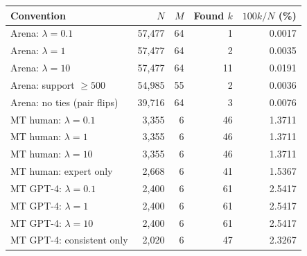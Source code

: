 \begin{tabular}{lrrrr}
\toprule
Convention & $N$ & $M$ & Found $k$ & $100k/N$ (\%) \\
\midrule
Arena: $\lambda=0.1$ & 57,477 & 64 & 1 & 0.0017 \\
Arena: $\lambda=1$ & 57,477 & 64 & 2 & 0.0035 \\
Arena: $\lambda=10$ & 57,477 & 64 & 11 & 0.0191 \\
Arena: support $\geq500$ & 54,985 & 55 & 2 & 0.0036 \\
Arena: no ties (pair flips) & 39,716 & 64 & 3 & 0.0076 \\
MT human: $\lambda=0.1$ & 3,355 & 6 & 46 & 1.3711 \\
MT human: $\lambda=1$ & 3,355 & 6 & 46 & 1.3711 \\
MT human: $\lambda=10$ & 3,355 & 6 & 46 & 1.3711 \\
MT human: expert only & 2,668 & 6 & 41 & 1.5367 \\
MT GPT-4: $\lambda=0.1$ & 2,400 & 6 & 61 & 2.5417 \\
MT GPT-4: $\lambda=1$ & 2,400 & 6 & 61 & 2.5417 \\
MT GPT-4: $\lambda=10$ & 2,400 & 6 & 61 & 2.5417 \\
MT GPT-4: consistent only & 2,020 & 6 & 47 & 2.3267 \\
\bottomrule
\end{tabular}
